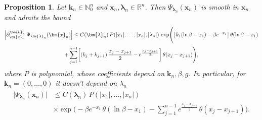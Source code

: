 \documentclass[11pt]{article}
\numberwithin{equation}{section}
\theoremstyle{plain}
\newtheorem{proposition}{Proposition}
\theoremstyle{definition}
\begin{document}
\begin{proposition} \label{prop:bc-bound}
	Let $\bm{k}_n \in \mathbb{N}_0^n$ and $\bm{x}_n, \bm{\lambda}_n \in \mathbb{R}^n$. Then $\Psi_{\bm{\lambda}_n}(\bm{x}_n)$ is smooth in $\bm{x}_n$ and admits the bound
	\begin{multline} \label{dPsi-b}
			\Bigl| \partial_{\bm{x}_n}^{\bm{k}_n} \, \Psi_{\bm{\lambda}_n} (\bm{x}_n) \Bigr| \leq C(\bm{\lambda}_n) \, P(|x_1|, \dots, |x_n|, |\lambda_n|) \, \exp\Biggl( \bigl[ k_1 (\ln \beta - x_1) - \beta e^{-x_1} \bigr] \, \theta(\ln \beta - x_1) \\[2pt]
			+ \sum_{j = 1}^{n - 1} \biggl[ (k_j + k_{j + 1}) \, \frac{x_j - x_{j + 1}}{2} -  e^{ \frac{x_j - x_{j + 1} }{2} } \biggr] \, \theta(x_j - x_{j + 1} ) \Biggr),
	\end{multline}
	where $P$ is polynomial, whose coefficients depend on $\bm{k}_n, \beta, g$. In particular, for $\bm{k}_n = (0, \dots, 0)$ it doesn't depend on $\lambda_n$
	\begin{align} \label{Psin-b}
		\begin{aligned}
			\bigl| \Psi_{\bm{\lambda}_n}(\bm{x}_n) \bigr| & \leq C(\bm{\lambda}_n) \,  P(|x_1|, \dots, |x_n|) \\[6pt]
			& \times \exp\Biggl( - \beta e^{-x_1} \, \theta(\ln \beta - x_1) - \sum_{j = 1}^{n - 1}  e^{ \frac{x_j - x_{j + 1} }{2} }  \, \theta(x_j - x_{j + 1} ) \Biggr).
		\end{aligned}
	\end{align}
\end{proposition}
\end{document}
